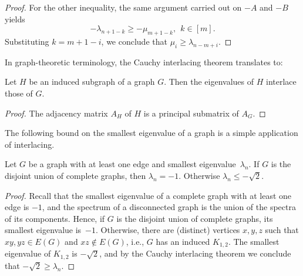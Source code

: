 \begin{proof}
    For the other inequality, the same argument carried out on $-A$ and $-B$ yields 
    \begin{equation*}
        -\lambda_{n + 1 - k} \ge -\mu_{m + 1 - k},\ \ k \in [m].
    \end{equation*}
    Substituting $k = m + 1 - i$, we conclude that $\mu_i \ge \lambda_{n - m + i}$.
\end{proof}

In graph-theoretic terminology, the Cauchy interlacing theorem translates to:
\begin{corollary}
    Let $H$ be an induced subgraph of a graph $G$. Then the eigenvalues of $H$ interlace those of $G$.
\end{corollary}

\begin{proof}
    The adjacency matrix $A_H$ of $H$ is a principal submatrix of $A_G$.
\end{proof}

The following bound on the smallest eigenvalue of a graph is a simple application of interlacing. 
\begin{proposition}
    Let $G$ be a graph with at least one edge and smallest \mbox{eigenvalue $\lambda_n$}.
    If $G$ is the disjoint union of complete graphs, then $\lambda_n = -1$. Otherwise $\lambda_n \le -\sqrt{2}$.
\end{proposition}

\begin{proof}
    Recall that the smallest eigenvalue of a complete graph with at least one edge is $-1$, and the spectrum of a disconnected graph is the union of the spectra of its components.
    Hence, if $G$ is the disjoint union of complete graphs, its smallest eigenvalue \mbox{is $-1$}. 
    Otherwise, there are (distinct) vertices $x, y, z$ such that $xy, yz \in E(G)$ and $xz \notin E(G)$, i.e., $G$ has an induced $K_{1,2}$.
    The smallest eigenvalue of $K_{1, 2}$ is $-\sqrt{2}$, and by the Cauchy interlacing theorem we conclude that $-\sqrt{2} \ge \lambda_n$.
\end{proof}

